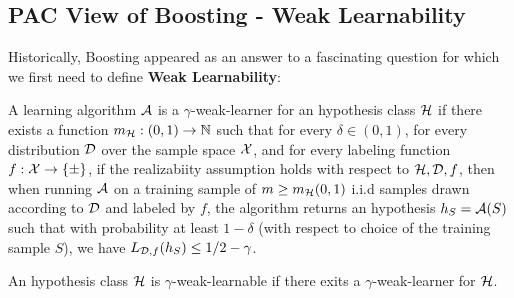 \subsection{PAC View of Boosting - Weak Learnability}
Historically, Boosting appeared as an answer to a fascinating question for which we first need to define \textbf{Weak Learnability}:\\

\begin{definition} 
A learning algorithm $\mathcal{A}$ is a $\gamma$-weak-learner for an hypothesis class $\mathcal{H}$ if there exists a function $m_{\mathcal{H}}:(0,1)\to\mathbb{N}$ such that for every $\delta\in\left(0,1\right)$, for every distribution $\mathcal{D}$ over the sample space $\mathcal{X}$, and for every labeling function $f:\mathcal{X}\to\left\{ \pm \right\}$, if the realizabiity assumption holds with respect to $\mathcal{H},\mathcal{D},f$, then when running $\mathcal{A}$ on a training sample of $m\geq m_{\mathcal{H}}(0,1)$ i.i.d samples drawn according to $\mathcal{D}$ and labeled by $f$, the algorithm returns an hypothesis $h_S=\mathcal{A}(S)$ such that with probability at least $1-\delta$ (with respect to choice of the training sample $S$), we have $L_{\mathcal{D},f}(h_S) \leq 1/2-\gamma$. 
\end{definition}

\begin{definition}
An hypothesis class $\mathcal{H}$ is $\gamma$-weak-learnable if there exits a $\gamma$-weak-learner for $\mathcal{H}$.
\end{definition}

